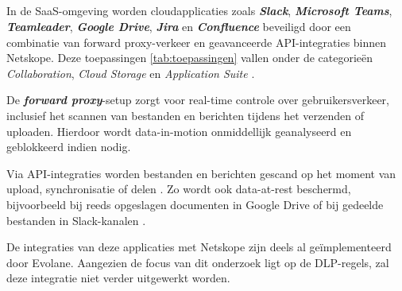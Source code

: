 \subsection{}
\label{subsubsec:saas-poc}


In de SaaS-omgeving worden cloudapplicaties zoals \textbf{\textit{Slack}}, \textbf{\textit{Microsoft Teams}}, \textbf{\textit{Teamleader}}, 
\textbf{\textit{Google Drive}}, \textbf{\textit{Jira}} en \textbf{\textit{Confluence}} beveiligd door een combinatie van forward proxy-verkeer en geavanceerde API-integraties binnen Netskope. 
Deze toepassingen \ref{tab:toepassingen} vallen onder de categorieën \textit{Collaboration}, \textit{Cloud Storage} en \textit{Application Suite} \autocite{Netskope2025API}.

De \textit{\textbf{forward proxy}}-setup zorgt voor real-time controle over gebruikersverkeer, 
inclusief het scannen van bestanden en berichten tijdens het verzenden of uploaden. 
Hierdoor wordt data-in-motion onmiddellijk geanalyseerd en geblokkeerd indien nodig.

Via API-integraties worden bestanden en berichten gescand op het moment van upload, synchronisatie of delen \autocite{Netskope2025API}. 
Zo wordt ook data-at-rest beschermd, bijvoorbeeld bij reeds opgeslagen documenten in Google Drive of bij gedeelde bestanden in Slack-kanalen \autocite{Netskope2022Slack}.

De integraties van deze applicaties met Netskope zijn deels al geïmplementeerd door Evolane. 
Aangezien de focus van dit onderzoek ligt op de DLP-regels, zal deze integratie niet verder uitgewerkt worden.

